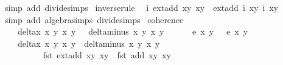 \begin{isabellebody}
{\isacharparenleft}simp\ add{\isacharcolon}\ divide{\isacharunderscore}simps{\isacharparenright}%
\endisatagproof
{\isafoldproof}%
%
\isadelimproof
\isanewline
%
\endisadelimproof
{}\isamarkupfalse%
\ inverse{\isacharunderscore}rule{\isacharunderscore}{}{\isacharcolon}\isanewline
\ \ {\isachardoublequoteopen}i\ {\isacharparenleft}ext{\isacharunderscore}add\ {\isacharparenleft}x{}{\isacharcomma}y{}{\isacharparenright}\ {\isacharparenleft}x{}{\isacharcomma}y{}{\isacharparenright}{\isacharparenright}\ {\isacharequal}\ ext{\isacharunderscore}add\ {\isacharparenleft}i\ {\isacharparenleft}x{}{\isacharcomma}y{}{\isacharparenright}{\isacharparenright}\ {\isacharparenleft}i\ {\isacharparenleft}x{}{\isacharcomma}y{}{\isacharparenright}{\isacharparenright}{\isachardoublequoteclose}\isanewline
%
\isadelimproof
\ \ %
\endisadelimproof
%
\isatagproof
{}\isamarkupfalse%
{\isacharparenleft}simp\ add{\isacharcolon}\ algebra{\isacharunderscore}simps\ divide{\isacharunderscore}simps{\isacharparenright}%
\endisatagproof
{\isafoldproof}%
%
\isadelimproof
\isanewline
%
\endisadelimproof
\isanewline
\isanewline
\isanewline
{}\isamarkupfalse%
\ coherence{\isacharunderscore}{}{\isacharcolon}\isanewline
\ \ \ {\isachardoublequoteopen}delta{\isacharunderscore}x\ x{}\ y{}\ x{}\ y{}\ {\isasymnoteq}\ {}{\isachardoublequoteclose}\ {\isachardoublequoteopen}delta{\isacharunderscore}minus\ x{}\ y{}\ x{}\ y{}\ {\isasymnoteq}\ {}{\isachardoublequoteclose}\ \isanewline
\ \ \ {\isachardoublequoteopen}e{\isacharprime}\ x{}\ y{}\ {\isacharequal}\ {}{\isachardoublequoteclose}\ {\isachardoublequoteopen}e{\isacharprime}\ x{}\ y{}\ {\isacharequal}\ {}{\isachardoublequoteclose}\isanewline
\ \ \ {\isachardoublequoteopen}delta{\isacharunderscore}x\ x{}\ y{}\ x{}\ y{}\ {\isacharasterisk}\ delta{\isacharunderscore}minus\ x{}\ y{}\ x{}\ y{}\ {\isacharasterisk}\isanewline
\ \ \ \ \ \ \ \ \ {\isacharparenleft}fst\ {\isacharparenleft}ext{\isacharunderscore}add\ {\isacharparenleft}x{}{\isacharcomma}y{}{\isacharparenright}\ {\isacharparenleft}x{}{\isacharcomma}y{}{\isacharparenright}{\isacharparenright}\ {\isacharminus}\ fst\ {\isacharparenleft}add\ {\isacharparenleft}x{}{\isacharcomma}y{}{\isacharparenright}\ {\isacharparenleft}x{}{\isacharcomma}y{}{\isacharparenright}{\isacharparenright}{\isacharparenright}\isanewline

\end{isabellebody}

